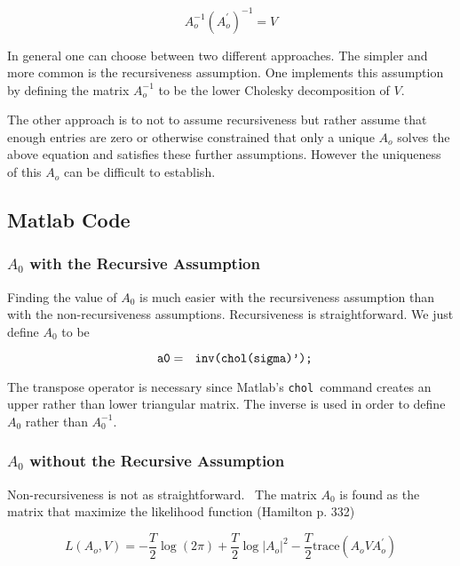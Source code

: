 \documentclass{article}
\begin{document}
\begin{equation*}
A_{o}^{-1}\left( A_{o}^{\prime }\right) ^{-1}=V
\end{equation*}

In general one can choose between two different approaches. The simpler and
more common is the recursiveness assumption. One implements this assumption
by defining the matrix $A_{o}^{-1}$ to be the lower Cholesky decomposition
of $V.$

The other approach is to not to assume recursiveness but rather assume that
enough entries are zero or otherwise constrained that only a unique $A_{o}$
solves the above equation and satisfies these further assumptions. However
the uniqueness of this $A_{o}$ can be difficult to establish.

\subsection{Matlab Code}

\subsubsection{$A_{0}$ with the Recursive Assumption}

Finding the value of $A_{0}$ is much easier with the recursiveness
assumption than with the non-recursiveness assumptions. Recursiveness is
straightforward. We just define $A_{0}$ to be

\begin{equation*}
\text{\texttt{a0}}=\text{\texttt{inv(chol(sigma)');}}
\end{equation*}

The transpose operator is necessary since Matlab's \texttt{chol }command
creates an upper rather than lower triangular matrix. The inverse is used in
order to define $A_{0}$ rather than $A_{0}^{-1}.$

\subsubsection{$A_{0}$ without the Recursive Assumption}

Non-recursiveness is not as straightforward. \ The matrix $A_{0}$ is found
as the matrix that maximize the likelihood function (Hamilton p. 332)

\begin{equation*}
L\left( A_{o},V\right) =-\frac{T}{2}\log \left( 2\pi \right) +\frac{T}{2}%
\log \left| A_{o}\right| ^{2}-\frac{T}{2}\text{trace}(A_{o}VA_{o}^{\prime })
\end{equation*}
\end{document}
